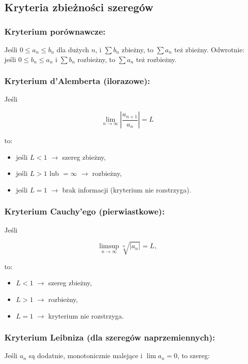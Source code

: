 \subsection{Kryteria zbieżności szeregów}

\subsubsection*{Kryterium porównawcze:}
Jeśli $0 \leq a_n \leq b_n$ dla dużych $n$, i $\sum b_n$ zbieżny, to $\sum a_n$ też zbieżny.
Odwrotnie: jeśli $0 \le b_n \le a_n$ i $\sum b_n$ rozbieżny, to $\sum a_n$ też rozbieżny.

\subsubsection*{Kryterium d'Alemberta (ilorazowe):}
Jeśli

$$
\lim_{n \to \infty} \left| \frac{a_{n+1}}{a_n} \right| = L
$$

to:
\begin{itemize}
    \item jeśli $L < 1$ $\rightarrow$ szereg zbieżny,
    \item jeśli $L > 1$ lub $= \infty$ $\rightarrow$ rozbieżny,
    \item jeśli $L = 1$ $\rightarrow$ brak informacji (kryterium nie rozstrzyga).
\end{itemize}

\subsubsection*{Kryterium Cauchy'ego (pierwiastkowe):}
Jeśli

$$
\limsup_{n \to \infty} \sqrt[n]{|a_n|} = L,
$$

to:
\begin{itemize}
    \item $L < 1$ $\rightarrow$ szereg zbieżny,
    \item $L > 1$ $\rightarrow$ rozbieżny,
    \item $L = 1$ $\rightarrow$ kryterium nie rozstrzyga.
\end{itemize}

\subsubsection*{Kryterium Leibniza (dla szeregów naprzemiennych):}
Jeśli $a_n$ są dodatnie, monotonicznie malejące i $\lim a_n = 0$, to szereg:

